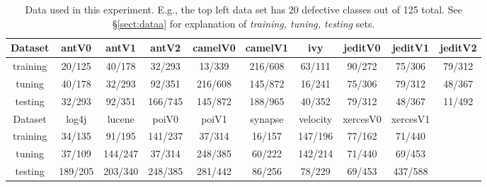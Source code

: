 \documentclass[final,twocolumn,5p]{elsarticle}
\newcommand{\tion}[1]{\S\ref{sect:#1}}
\begin{document}


 \begin{table}[!t]

\renewcommand{\baselinestretch}{0.8}
\scriptsize
\centering
  \begin{tabular}{c c c c c c c c c c } \hline
  Dataset &antV0&antV1&antV2&camelV0&camelV1&ivy&jeditV0&jeditV1&jeditV2
\\\hline
  training &20/125 &40/178 &32/293 &13/339 &216/608 &63/111 &90/272 &75/306 &79/312
\\  tuning  &40/178 &32/293 &92/351 &216/608 &145/872 &16/241 &75/306 &79/312 &48/367
\\  testing &32/293 &92/351 &166/745 &145/872 &188/965 &40/352 &79/312 &48/367 &11/492
\\ \hline
  Dataset &log4j&lucene&poiV0&poiV1&synapse&velocity&xercesV0&xercesV1
\\\hline
  training &34/135 &91/195 &141/237 &37/314 &16/157 &147/196 &77/162 &71/440
\\  tuning  &37/109 &144/247 &37/314 &248/385 &60/222 &142/214 &71/440 &69/453
\\  testing &189/205 &203/340 &248/385 &281/442 &86/256 &78/229 &69/453 &437/588
\\  \end{tabular}

   \caption{Data used in this experiment. 
   E.g., the top left data set has 20 defective classes out of 125 total.
   See \tion{dataa} for explanation of {\em training, tuning, testing} sets.
   }\label{tab:data1}
\end{table} 
\end{document}
